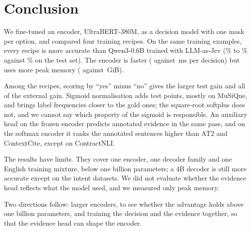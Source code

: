 \section{Conclusion}
\label{sec:conclusion}

We fine-tuned an encoder, UltraBERT-380M, as a decision model with one mask per option, and compared four training recipes.
On the same training examples, every recipe is more accurate than Qwen3-0.6B trained with LLM-as-Jev (\TestUbList{}\% to \TestUbSig{}\% against \TestQwFull{}\% on the test set).
The encoder is faster (\MsUb{} against \MsQwFull{}\,ms per decision) but uses more peak memory (\MemPeakUb{} against \MemPeakQwFull{}\,GiB).

Among the recipes, scoring by ``yes'' minus ``no'' gives the larger test gain and all of the external gain.
Sigmoid normalisation adds \DiffUbSigUbYesNoAbs{} test points, mostly on MuSiQue, and brings label frequencies closer to the gold ones; the square-root softplus does not, and we cannot say which property of the sigmoid is responsible.
An auxiliary head on the frozen encoder predicts annotated evidence in the same pass, and on the softmax encoder it ranks the annotated sentences higher than AT2 and ContextCite, except on ContractNLI.

The results have limits.
They cover one encoder, one decoder family and one English training mixture, below one billion parameters; a 4B decoder is still more accurate except on the intent datasets.
We did not evaluate whether the evidence head reflects what the model used, and we measured only peak memory.

Two directions follow: larger encoders, to see whether the advantage holds above one billion parameters, and training the decision and the evidence together, so that the evidence head can shape the encoder.
